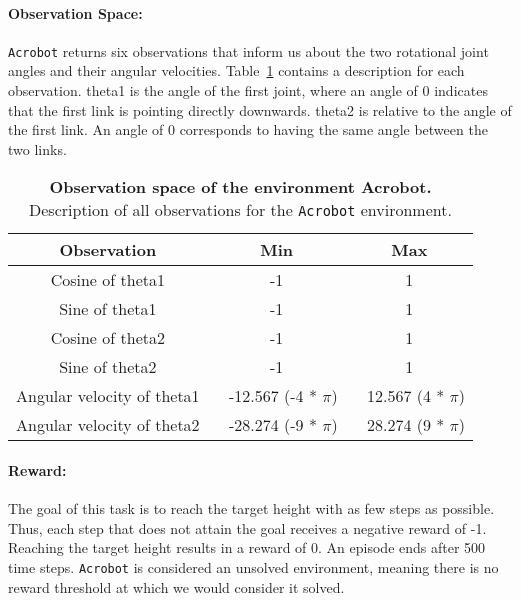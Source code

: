 \paragraph*{Observation Space:} \verb|Acrobot| returns six observations that inform us about the two rotational joint angles and their angular velocities. Table~\ref{table:acrobot_obs} contains a description for each observation. theta1 is the angle of the first joint, where an angle of 0 indicates that the first link is pointing directly downwards. theta2 is relative to the angle of the first link. An angle of 0 corresponds to having the same angle between the two links.
\begin{table}[!ht]
  \centering
  \begin{tabular}{ |c|c|c| }
    \hline
    Observation & Min & Max \\
    \hline
    Cosine of theta1 & -1 & 1 \\
    Sine of theta1 & -1 & 1 \\
    Cosine of theta2 & -1 & 1 \\
    Sine of theta2 & -1 & 1 \\
    Angular velocity of theta1 & ~ -12.567 (-4 * $\pi$) & ~ 12.567 (4 * $\pi$) \\
    Angular velocity of theta2 & ~ -28.274 (-9 * $\pi$) & ~ 28.274 (9 * $\pi$) \\
    \hline
  \end{tabular}
  \caption[Observation space of the environment Acrobot]{
    \textbf{Observation space of the environment Acrobot.}
    Description of all observations for the \texttt{Acrobot} environment.
  }
  \label{table:acrobot_obs}
\end{table}

\paragraph*{Reward:} The goal of this task is to reach the target height with as few steps as possible. Thus, each step that does not attain the goal receives a negative reward of -1. Reaching the target height results in a reward of 0. An episode ends after 500 time steps. \verb|Acrobot| is considered an unsolved environment, meaning there is no reward threshold at which we would consider it solved.

